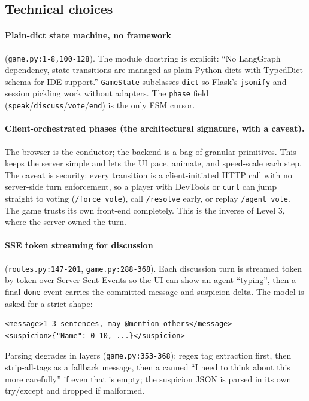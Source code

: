 \documentclass[11pt,a4paper]{article}
\begin{document}
\subsection{Technical choices}

\paragraph{Plain-dict state machine, no framework} (\texttt{game.py:1-8,100-128}).
The module docstring is explicit: ``No LangGraph dependency, state transitions are
managed as plain Python dicts with TypedDict schema for IDE support.''
\texttt{GameState} subclasses \texttt{dict} so Flask's \texttt{jsonify} and session
pickling work without adapters. The \texttt{phase} field
(\texttt{speak}/\texttt{discuss}/\texttt{vote}/\texttt{end}) is the only FSM cursor.

\paragraph{Client-orchestrated phases (the architectural signature, with a
caveat).} The browser is the conductor; the backend is a bag of granular
primitives. This keeps the server simple and lets the UI pace, animate, and
speed-scale each step. The caveat is security: every transition is a
client-initiated HTTP call with no server-side turn enforcement, so a player with
DevTools or \texttt{curl} can jump straight to voting (\texttt{/force\_vote}), call
\texttt{/resolve} early, or replay \texttt{/agent\_vote}. The game trusts its own
front-end completely. This is the inverse of Level 3, where the server owned the
turn.

\paragraph{SSE token streaming for discussion} (\texttt{routes.py:147-201},
\texttt{game.py:288-368}). Each discussion turn is streamed token by token over
Server-Sent Events so the UI can show an agent ``typing'', then a final
\texttt{done} event carries the committed message and suspicion delta. The model
is asked for a strict shape:
\begin{lstlisting}
<message>1-3 sentences, may @mention others</message>
<suspicion>{"Name": 0-10, ...}</suspicion>
\end{lstlisting}
Parsing degrades in layers (\texttt{game.py:353-368}): regex tag extraction first,
then strip-all-tags as a fallback message, then a canned ``I need to think about
this more carefully'' if even that is empty; the suspicion JSON is parsed in its
own try/except and dropped if malformed.
\end{document}
